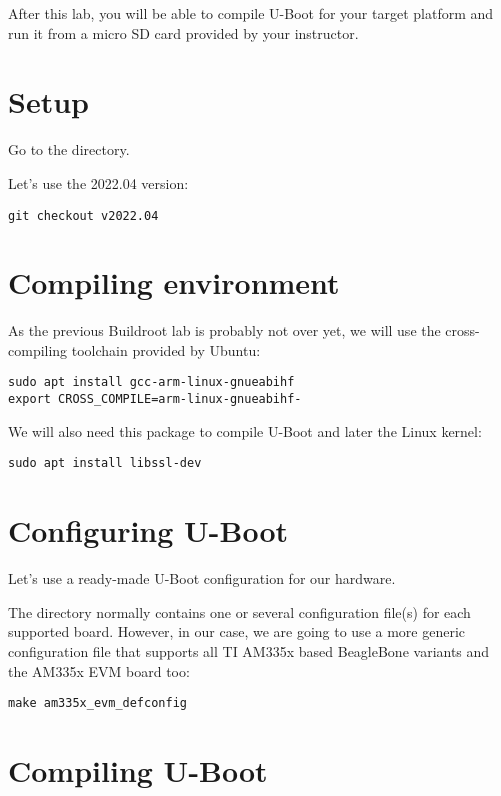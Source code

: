
After this lab, you will be able to compile U-Boot for your target
platform and run it from a micro SD card provided by your instructor.

\section{Setup}

Go to the  directory.

Let's use the 2022.04 version:
\begin{verbatim}
git checkout v2022.04
\end{verbatim}

\section{Compiling environment}

As the previous Buildroot lab is probably not over yet, we will
use the cross-compiling toolchain provided by Ubuntu:

\begin{verbatim}
sudo apt install gcc-arm-linux-gnueabihf
export CROSS_COMPILE=arm-linux-gnueabihf-
\end{verbatim}

We will also need this package to compile U-Boot and later the
Linux kernel:
\begin{verbatim}
sudo apt install libssl-dev
\end{verbatim}

\section{Configuring U-Boot}

Let's use a ready-made U-Boot configuration for our hardware.

The  directory normally contains one or several
configuration file(s) for each supported board. However, in our case,
we are going to use a more generic configuration file that supports all
TI AM335x based BeagleBone variants and the AM335x EVM board too:

\begin{verbatim}
make am335x_evm_defconfig
\end{verbatim}

\section{Compiling U-Boot}

